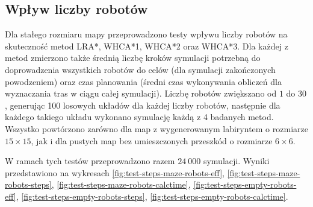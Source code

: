 \subsection{Wpływ liczby robotów} %
\label{ch:tests-function-robots}
Dla stałego rozmiaru mapy przeprowadzono testy wpływu liczby robotów na skuteczność metod LRA*, WHCA*1, WHCA*2 oraz WHCA*3.
Dla każdej z metod zmierzono także średnią liczbę kroków symulacji potrzebną do doprowadzenia wszystkich robotów do celów (dla symulacji zakończonych powodzeniem) oraz czas planowania (średni czas wykonywania obliczeń dla wyznaczania tras w ciągu całej symulacji).
Liczbę robotów zwiększano od $1$ do $30$, generując 100 losowych układów dla każdej liczby robotów, następnie dla każdego takiego układu wykonano symulację każdą z 4 badanych metod.
Wszystko powtórzono zarówno dla map z wygenerowanym labiryntem o rozmiarze $15 \times 15$, jak i dla pustych map bez umieszczonych przeszkód o rozmiarze $6 \times 6$.

W ramach tych testów przeprowadzono razem $24\ 000$ symulacji.
Wyniki przedstawiono na wykresach \ref{fig:test-steps-maze-robots-eff}, \ref{fig:test-steps-maze-robots-steps}, \ref{fig:test-steps-maze-robots-calctime}, \ref{fig:test-steps-empty-robots-eff}, \ref{fig:test-steps-empty-robots-steps}, \ref{fig:test-steps-empty-robots-calctime}.



